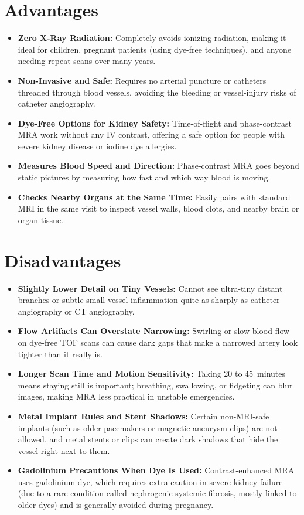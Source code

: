 \section{Advantages}
\begin{itemize}
\item \textbf{Zero X-Ray Radiation:} Completely avoids ionizing radiation, making it ideal for children, pregnant patients (using dye-free techniques), and anyone needing repeat scans over many years.
\item \textbf{Non-Invasive and Safe:} Requires no arterial puncture or catheters threaded through blood vessels, avoiding the bleeding or vessel-injury risks of catheter angiography.
\item \textbf{Dye-Free Options for Kidney Safety:} Time-of-flight and phase-contrast MRA work without any IV contrast, offering a safe option for people with severe kidney disease or iodine dye allergies.
\item \textbf{Measures Blood Speed and Direction:} Phase-contrast MRA goes beyond static pictures by measuring how fast and which way blood is moving.
\item \textbf{Checks Nearby Organs at the Same Time:} Easily pairs with standard MRI in the same visit to inspect vessel walls, blood clots, and nearby brain or organ tissue.
\end{itemize}

\section{Disadvantages}
\begin{itemize}
\item \textbf{Slightly Lower Detail on Tiny Vessels:} Cannot see ultra-tiny distant branches or subtle small-vessel inflammation quite as sharply as catheter angiography or CT angiography.
\item \textbf{Flow Artifacts Can Overstate Narrowing:} Swirling or slow blood flow on dye-free TOF scans can cause dark gaps that make a narrowed artery look tighter than it really is.
\item \textbf{Longer Scan Time and Motion Sensitivity:} Taking 20 to 45~minutes means staying still is important; breathing, swallowing, or fidgeting can blur images, making MRA less practical in unstable emergencies.
\item \textbf{Metal Implant Rules and Stent Shadows:} Certain non-MRI-safe implants (such as older pacemakers or magnetic aneurysm clips) are not allowed, and metal stents or clips can create dark shadows that hide the vessel right next to them.
\item \textbf{Gadolinium Precautions When Dye Is Used:} Contrast-enhanced MRA uses gadolinium dye, which requires extra caution in severe kidney failure (due to a rare condition called nephrogenic systemic fibrosis, mostly linked to older dyes) and is generally avoided during pregnancy.
\end{itemize}

